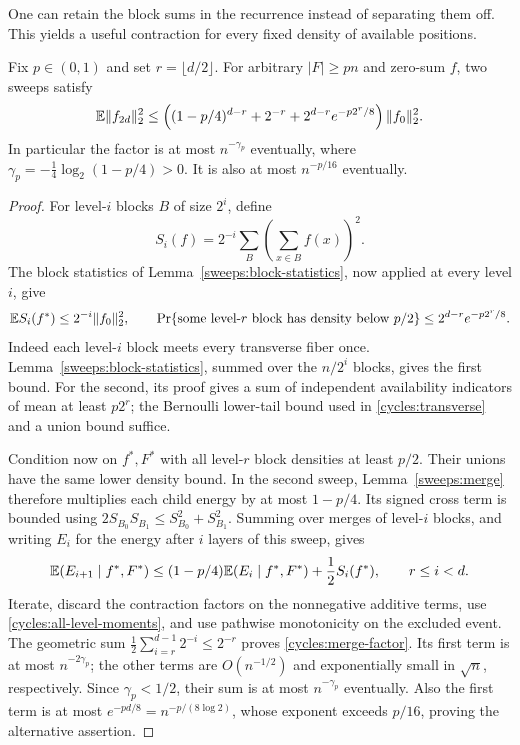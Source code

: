 One can retain the block sums in the recurrence instead of separating
them off. This yields a useful contraction for every fixed density of available positions.

\begin{proposition}
\label{cycles:merge-prop}
Fix $p\in(0,1)$ and set $r=\lfloor d/2\rfloor$. For arbitrary
$|F|\ge pn$ and zero-sum $f$, two sweeps satisfy
\begin{equation}\label{cycles:merge-factor}
 \mathbb E\|f_{2d}\|_2^2\le
 \left((1-p/4)^{d-r}+2^{-r}
             +2^{d-r}e^{-p2^r/8}\right)\|f_0\|_2^2.
\end{equation}
In particular the factor is at most $n^{-\gamma_p}$ eventually, where
$\gamma_p=-\frac14\log_2(1-p/4)>0$.
It is also at most $n^{-p/16}$ eventually.
\end{proposition}
\begin{proof}
For level-$i$ blocks $B$ of size $2^i$, define
\[
 S_i(f)=2^{-i}\sum_B\left(\sum_{x\in B}f(x)\right)^2.
\]
The block statistics of Lemma~\ref{sweeps:block-statistics}, now
applied at every level $i$, give
\begin{equation}\label{cycles:all-level-moments}
 \mathbb E S_i(f^*)\le2^{-i}\|f_0\|_2^2,\qquad
 \Pr\{\text{some level-$r$ block has density below }p/2\}
 \le2^{d-r}e^{-p2^r/8}.
\end{equation}
Indeed each level-$i$ block meets every transverse fiber once.
Lemma~\ref{sweeps:block-statistics}, summed over the $n/2^i$ blocks,
gives the first bound. For the second, its proof gives a sum of independent
availability indicators of mean at least $p2^r$; the Bernoulli lower-tail
bound used in \eqref{cycles:transverse} and a union bound suffice.

Condition now on $f^*,F^*$ with all level-$r$ block densities at
least $p/2$. Their unions have the same lower density bound. In the
second sweep, Lemma~\ref{sweeps:merge} therefore multiplies each
child energy by at most $1-p/4$. Its signed cross term is bounded
using $2S_{B_0}S_{B_1}\le S_{B_0}^2+S_{B_1}^2$. Summing over
merges of level-$i$ blocks, and writing $E_i$ for the energy after
$i$ layers of this sweep, gives
\[
 \mathbb E(E_{i+1}\mid f^*,F^*)
 \le(1-p/4)\mathbb E(E_i\mid f^*,F^*)+\frac12S_i(f^*),
 \qquad r\le i<d.
\]
Iterate, discard the contraction factors on the nonnegative additive
terms, use \eqref{cycles:all-level-moments}, and use pathwise monotonicity
on the excluded event. The geometric sum
$\frac12\sum_{i=r}^{d-1}2^{-i}\le2^{-r}$ proves
\eqref{cycles:merge-factor}. Its first term is at most $n^{-2\gamma_p}$;
the other terms are $O(n^{-1/2})$ and exponentially small in $\sqrt n$,
respectively. Since $\gamma_p<1/2$, their sum is at most
$n^{-\gamma_p}$ eventually. Also the first term is at most
$e^{-pd/8}=n^{-p/(8\log2)}$, whose exponent exceeds $p/16$,
proving the alternative assertion.
\end{proof}

